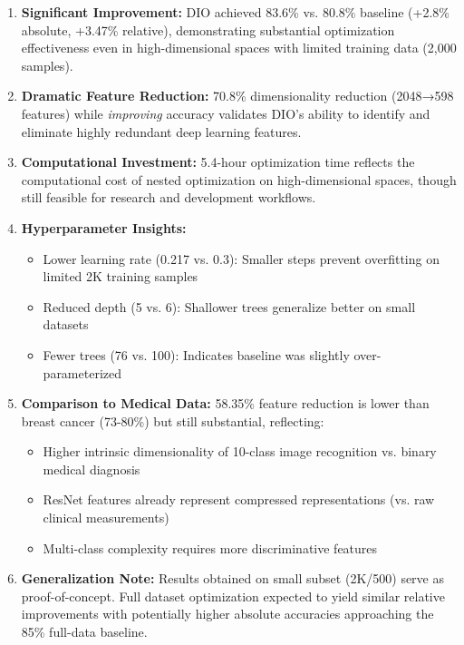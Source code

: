 \documentclass[12pt, a4paper]{article}
\begin{document}
\begin{enumerate}
    \item \textbf{Significant Improvement:} DIO achieved 83.6\% vs. 80.8\% baseline (+2.8\% absolute, +3.47\% relative), demonstrating substantial optimization effectiveness even in high-dimensional spaces with limited training data (2,000 samples).
    
    \item \textbf{Dramatic Feature Reduction:} 70.8\% dimensionality reduction (2048→598 features) while \textit{improving} accuracy validates DIO's ability to identify and eliminate highly redundant deep learning features.
    
    \item \textbf{Computational Investment:} 5.4-hour optimization time reflects the computational cost of nested optimization on high-dimensional spaces, though still feasible for research and development workflows.
    
    \item \textbf{Hyperparameter Insights:}
    \begin{itemize}
        \item Lower learning rate (0.217 vs. 0.3): Smaller steps prevent overfitting on limited 2K training samples
        \item Reduced depth (5 vs. 6): Shallower trees generalize better on small datasets
        \item Fewer trees (76 vs. 100): Indicates baseline was slightly over-parameterized
    \end{itemize}
    
    \item \textbf{Comparison to Medical Data:} 58.35\% feature reduction is lower than breast cancer (73-80\%) but still substantial, reflecting:
    \begin{itemize}
        \item Higher intrinsic dimensionality of 10-class image recognition vs. binary medical diagnosis
        \item ResNet features already represent compressed representations (vs. raw clinical measurements)
        \item Multi-class complexity requires more discriminative features
    \end{itemize}
    
    \item \textbf{Generalization Note:} Results obtained on small subset (2K/500) serve as proof-of-concept. Full dataset optimization expected to yield similar relative improvements with potentially higher absolute accuracies approaching the 85\% full-data baseline.
\end{enumerate}
\end{document}
